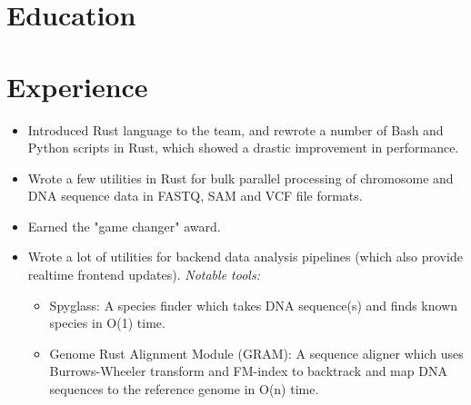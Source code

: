 \documentclass[11pt,a4paper,sans]{moderncv}        %
\begin{document}


\vspace*{-1.8\baselineskip}
\makecvtitle
\vspace{-1.75\baselineskip}

\section{Education}


\section{Experience}
{\begin{itemize}
\item Introduced Rust language to the team, and rewrote a number of Bash and Python scripts in Rust, which showed a drastic improvement in performance.
\item Wrote a few utilities in Rust for bulk parallel processing of chromosome and DNA sequence data in FASTQ, SAM and VCF file formats.
\item Earned the "game changer" award.
\end{itemize}}
{\begin{itemize}
\item Wrote a lot of utilities for backend data analysis pipelines (which also provide realtime frontend updates).
\textit{Notable tools:}
{\begin{itemize}
\item Spyglass: A species finder which takes DNA sequence(s) and finds known species in O(1) time.
\item Genome Rust Alignment Module (GRAM): A sequence aligner which uses Burrows-Wheeler transform and FM-index to backtrack and map DNA sequences to the reference genome in O(n) time.
\end{itemize}}
\end{itemize}}
\end{document}
